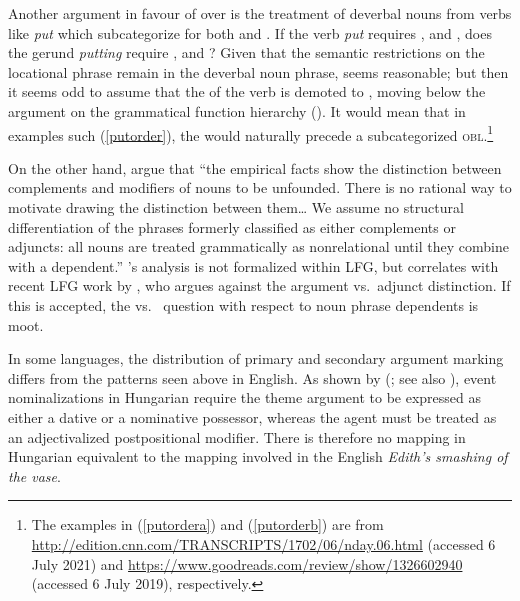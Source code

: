 \documentclass[output=paper,hidelinks]{langscibook}
\begin{document}
Another argument in favour of {\OBLTHETA} over {\ADJ} is the treatment of deverbal nouns from verbs like \emph{put} which subcategorize for both {\OBJ} and {\OBLTHETA}. If the verb \emph{put} requires {\SUBJ}, {\OBJ} and , does the gerund \emph{putting} require {\POSS},  and {\ADJ}? Given that the semantic restrictions on the locational phrase remain in the deverbal noun phrase,  seems reasonable; but then it seems odd to assume that the {\OBJ} of the verb is demoted to {\ADJ}, moving below the  argument on the grammatical function hierarchy (). It would mean that in examples such (\ref{putorder}), the {\ADJ} would naturally precede a subcategorized \textsc{obl}.\footnote{The examples in (\ref{putordera}) and (\ref{putorderb}) are from \url{http://edition.cnn.com/TRANSCRIPTS/1702/06/nday.06.html} (accessed 6 July 2021) and \url{https://www.goodreads.com/review/show/1326602940} (accessed 6 July 2019), respectively.}


 \eal\label{putorder}
 \label{putordera}
 \label{putorderb}
 \zl

On the other hand, \citet[795]{Payneetal13} argue that ``the empirical facts show the distinction between complements and modifiers of nouns to be unfounded. There is no rational way to motivate drawing the distinction between them\ldots{} We assume no structural differentiation of the phrases formerly classified as either complements or adjuncts: all nouns are treated grammatically as nonrelational until they combine with a dependent.'' \citeauthor{Payneetal13}'s analysis is not formalized within LFG, but correlates with recent LFG work by \citet{Przep16,Przep17a}, who argues against the argument vs.\ adjunct distinction. If this is accepted, the {\OBLTHETA} vs.\ {\ADJ} question with respect to noun phrase dependents is moot.





In some languages, the distribution of primary and secondary argument marking differs from the patterns seen above in English. As shown by \citeauthor{Laczko95} (\citeyear{Laczko95,Laczko00}; see also \citealp{Laczko07,Laczko17}), event nominalizations in Hungarian require the theme argument to be expressed as either a dative or a nominative possessor, whereas the agent must be treated as an adjectivalized postpositional modifier. There is therefore no mapping in Hungarian equivalent to the mapping involved in the English \emph{Edith's smashing of the vase}.
\end{document}
